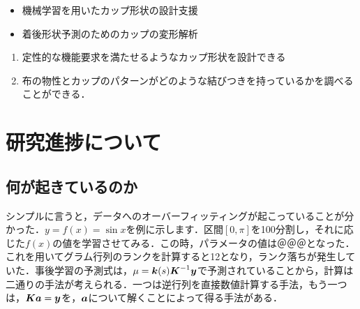 \documentclass[11pt]{jsarticle}
\begin{document}
	\articleSPRabst
		\begin{itemize}
			\item 機械学習を用いたカップ形状の設計支援
			\item 着後形状予測のためのカップの変形解析
		\end{itemize}
		
		
	\articleSPRobj
		\begin{enumerate}
			\item 定性的な機能要求を満たせるようなカップ形状を設計できる
			\item 布の物性とカップのパターンがどのような結びつきを持っているかを調べることができる．
		\end{enumerate}
	\articleSPRitemsone
		
		\tableofcontents
		
		
	\articleSPRitemstwo
	\renewcommand{\labelitemi}{$\blacktriangledown$}
	\newcommand{\argmax}{\mathop{\rm arg~max}\limits}
	\newcommand{\argmin}{\mathop{\rm arg~min}\limits}
	\newcommand{\Ker}{{\rm Ker}}
	\newcommand{\rank}{{\rm rank}}
	\section{研究進捗について}
		\subsection{何が起きているのか}
			シンプルに言うと，データへのオーバーフィッティングが起こっていることが分かった．$ y=f(x) = \sin x $を例に示します．区間$ [0,\pi] $を100分割し，それに応じた$ f(x) $の値を学習させてみる．この時，パラメータの値は＠＠＠となった．これを用いてグラム行列のランクを計算すると12となり，ランク落ちが発生していた．事後学習の予測式は，$ \mu = \boldsymbol{k}(s) \boldsymbol{K}^{-1} \boldsymbol{y} $で予測されていることから，計算は二通りの手法が考えられる．一つは逆行列を直接数値計算する手法，もう一つは，$ \boldsymbol{K} \boldsymbol{a} = \boldsymbol{y} $を，$ \boldsymbol{a} $について解くことによって得る手法がある．
			
\end{document}
